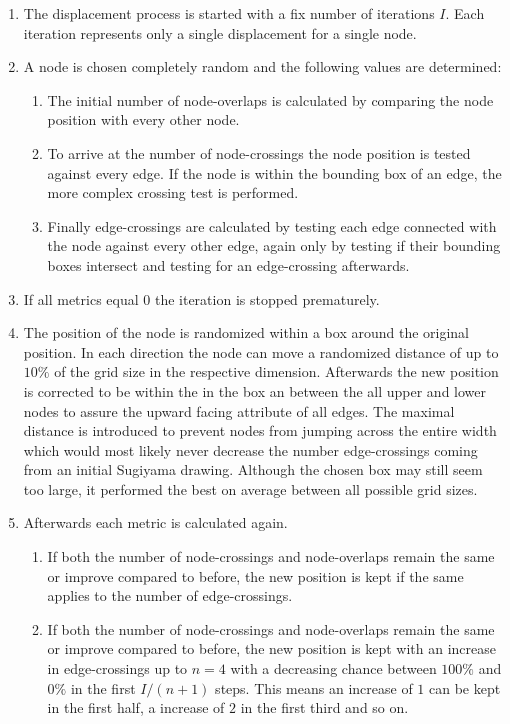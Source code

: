 \documentclass[]{llncs}
\begin{document}
\medskip
\begin{enumerate}[start=0]
    \item The displacement process is started with a fix number of iterations $I$. Each iteration represents only a single displacement for a single node.
    \item A node is chosen completely random and the following values are determined:
    \begin{enumerate}
        \item The initial number of node-overlaps is calculated by comparing the node position with every other node.
        \item To arrive at the number of node-crossings the node position is tested against every edge. If the node is within the bounding box of an edge, the more complex crossing test is performed.
        \item Finally edge-crossings are calculated by testing each edge connected with the node against every other edge, again only by testing if their bounding boxes intersect and testing for an edge-crossing afterwards.
    \end{enumerate}
	\item If all metrics equal $0$ the iteration is stopped prematurely.
	\item The position of the node is randomized within a box around the original position. In each direction the node can move a randomized distance of up to $10\%$ of the grid size in the respective dimension. Afterwards the new position is corrected to be within the in the box an between the all upper and lower nodes to assure the upward facing attribute of all edges. The maximal distance is introduced to prevent nodes from jumping across the entire width which would most likely never decrease the number edge-crossings coming from an initial Sugiyama drawing. Although the chosen box may still seem too large, it performed the best on average between all possible grid sizes. 
    \item Afterwards each metric is calculated again.
    \begin{enumerate}
        \item If both the number of node-crossings and node-overlaps remain the same or improve compared to before, the new position is kept if the same applies to the number of edge-crossings.
        \item If both the number of node-crossings and node-overlaps remain the same or improve compared to before, the new position is kept with an increase in edge-crossings up to $n = 4$ with a decreasing chance between $100\%$ and $0\%$ in the first $I / (n + 1)$ steps. This means an increase of $1$ can be kept in the first half, a increase of $2$ in the first third and so on. 

\end{enumerate}
\end{enumerate}
\end{document}
